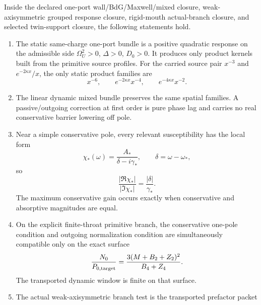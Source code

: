 \begin{theorem}
\label{thm:app-part07-main}
Inside the declared one-port wall/BdG/Maxwell/mixed closure, weak-axisymmetric grouped response closure, rigid-mouth actual-branch closure, and selected twin-support closure, the following statements hold.
\begin{enumerate}[leftmargin=2.2em]
  \item The static same-charge one-port bundle is a positive quadratic response on the admissible side \(\Omega_U^2>0\), \(\Delta>0\), \(D_0>0\).  It produces only product kernels built from the primitive source profiles.  For the carried source pair \(x^{-3}\) and \(e^{-2\kappa x}/x\), the only static product families are
  \begin{equation}
  \label{eq:app-part07-main-static-families}
  x^{-6},
  \qquad
  e^{-2\kappa x}x^{-4},
  \qquad
  e^{-4\kappa x}x^{-2}.
  \end{equation}
  \item The linear dynamic mixed bundle preserves the same spatial families.  A passive/outgoing correction at first order is pure phase lag and carries no real conservative barrier lowering off pole.
  \item Near a simple conservative pole, every relevant susceptibility has the local form
  \begin{equation}
  \label{eq:app-part07-main-line-shape}
  \chi_*(\omega)=\frac{A_*}{\delta-i\gamma_*},
  \qquad
  \delta=\omega-\omega_*,
  \end{equation}
  so
  \begin{equation}
  \label{eq:app-part07-main-line-ratio}
  \frac{|\Re\chi_*|}{|\Im\chi_*|}=\frac{|\delta|}{\gamma_*}.
  \end{equation}
  The maximum conservative gain occurs exactly when conservative and absorptive magnitudes are equal.
  \item On the explicit finite-throat primitive branch, the conservative one-pole condition and outgoing normalization condition are simultaneously compatible only on the exact surface
  \begin{equation}
  \label{eq:app-part07-main-compatibility-surface}
  \frac{N_0}{P_{0,{\rm target}}}
  =
  \frac{3(M+B_2+Z_2)^2}{B_4+Z_4}.
  \end{equation}
  The transported dynamic window is finite on that surface.
  \item The actual weak-axisymmetric branch test is the transported prefactor packet

\end{enumerate}
\end{theorem}
